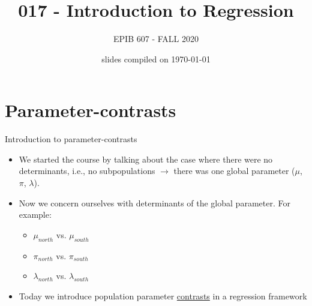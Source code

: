 \documentclass[10pt,handout]{beamer}\usepackage[]{graphicx}\usepackage[]{color}
\begin{document}
	


	\title{017 - Introduction to Regression}
\author{EPIB 607 - FALL 2020}

\date{slides compiled on \today}

\maketitle


\section{Parameter-contrasts}

\begin{frame}{Introduction to parameter-contrasts}
	
	\begin{itemize}
		\setlength\itemsep{2em}
		\item We started the course by talking about the case where there were no determinants, i.e., no subpopulations $\to$ there was one global parameter ($\mu$, $\pi$, $\lambda$). \pause 
		\item Now we concern ourselves with determinants of the global parameter. For example:
		\begin{itemize}
			\item $\mu_{north}$ vs. $\mu_{south}$
			\item $\pi_{north}$ vs. $\pi_{south}$
			\item $\lambda_{north}$ vs. $\lambda_{south}$
		\end{itemize}
		
		\item Today we introduce population parameter \underline{contrasts} in a regression framework
		
	\end{itemize}
	
\end{frame}
\end{document}
